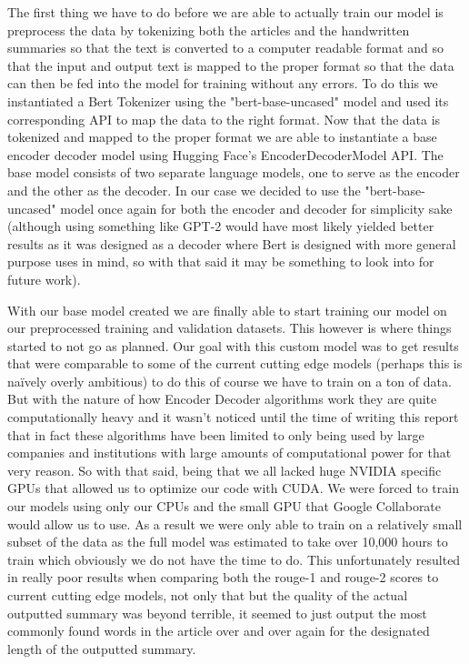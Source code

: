 \documentclass[twoside,twocolumn]{article}
\begin{document}
The first thing we have to do before we are able to actually train our model is preprocess the data by tokenizing both the articles and the handwritten summaries so that the text is converted to a computer readable format and so that the input and output text is mapped to the proper format so that the data can then be fed into the model for training without any errors. To do this we instantiated a Bert Tokenizer using the "bert-base-uncased" model and used its corresponding API to map the data to the right format. Now that the data is tokenized and mapped to the proper format we are able to instantiate a base encoder decoder model using Hugging Face's EncoderDecoderModel API. The base model consists of two separate language models, one to serve as the encoder and the other as the decoder. In our case we decided to use the "bert-base-uncased" model once again for both the encoder and decoder for simplicity sake (although using something like GPT-2 would have most likely yielded better results as it was designed as a decoder where Bert is designed with more general purpose uses in mind, so with that said it may be something to look into for future work). 

With our base model created we are finally able to start training our model on our preprocessed training and validation datasets. This however is where things started to not go as planned. Our goal with this custom model was to get results that were comparable to some of the current cutting edge models (perhaps this is naïvely overly ambitious) to do this of course we have to train on a ton of data. But with the nature of how Encoder Decoder algorithms work they are quite computationally heavy and it wasn't noticed until the time of writing this report that in fact these algorithms have been limited to only being used by large companies and institutions with large amounts of computational power for that very reason. So with that said, being that we all lacked huge NVIDIA specific GPUs that allowed us to optimize our code with CUDA. We were forced to train our models using only our CPUs and the small GPU that Google Collaborate would allow us to use. As a result we were only able to train on a relatively small subset of the data as the full model was estimated to take over 10,000 hours to train which obviously we do not have the time to do. This unfortunately resulted in really poor results when comparing both the rouge-1 and rouge-2 scores to current cutting edge models, not only that but the quality of the actual outputted summary was beyond terrible, it seemed to just output the most commonly found words in the article over and over again for the designated length of the outputted summary. 
\end{document}
